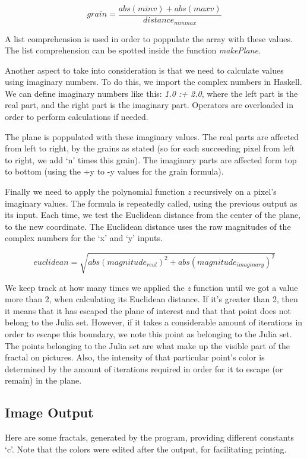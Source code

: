 $$ grain = \frac{abs(minv) + abs(maxv)}{distance_{minmax}}  $$

A list comprehension is used in order to poppulate the array with these values.
The list comprehension can be spotted inside the function \textit{makePlane}.

Another aspect to take into consideration is that we need to calculate values
using imaginary numbers. To do this, we import the complex numbers in Haskell.
We can define imaginary numbers like this: \textit{1.0 :+ 2.0}, where the left
part is the real part, and the right part is the imaginary part. Operators are
overloaded in order to perform calculations if needed. 

The plane is poppulated with these imaginary values. The real parts are
affected from left to right, by the grains as stated (so for each succeeding
pixel from left to right, we add `n' times this grain). The imaginary parts are
affected form top to bottom (using the +y to -y values for the grain formula).

Finally we need to apply the polynomial function \textit{z} recursively on a
pixel's imaginary values. The formula is repeatedly called, using the previous
output as its input. Each time, we test the Euclidean distance from the center
of the plane, to the new coordinate. The Euclidean distance uses the raw
magnitudes of the complex numbers for the `x' and `y' inputs. 

$$ euclidean = \sqrt{abs(magnitude_{real})^{2} + abs(magnitude_{imaginary})^{2}} $$

We keep track at how many times we applied the \textit{z} function until we got
a value more than 2, when calculating its Euclidean distance. If it's greater
than 2, then it means that it has escaped the plane of interest and that that
point does not belong to the Julia set. However, if it takes a considerable
amount of iterations in order to escape this boundary, we note this point as
belonging to the Julia set. The points belonging to the Julia set are what make
up the visible part of the fractal on pictures. Also, the intensity of that 
particular point's color is determined by the amount of iterations required in
order for it to escape (or remain) in the plane. 

\subsection{Image Output}

Here are some fractals, generated by the program, providing different constants
`c'. Note that the colors were edited after the output, for facilitating
printing.



